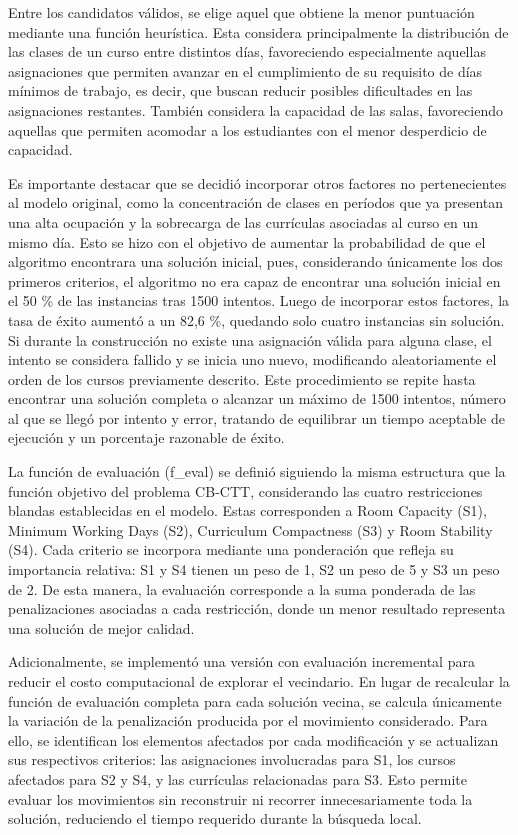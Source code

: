 \documentclass[letter, 10pt]{article}
\begin{document}
Entre los candidatos v\'alidos, se elige aquel que obtiene la menor puntuaci\'on mediante una funci\'on heur\'istica. Esta considera principalmente la distribuci\'on de las clases de un curso entre distintos d\'ias, favoreciendo especialmente aquellas asignaciones que permiten avanzar en el cumplimiento de su requisito de d\'ias m\'inimos de trabajo, es decir, que buscan reducir posibles dificultades en las asignaciones restantes. Tambi\'en considera la capacidad de las salas, favoreciendo aquellas que permiten acomodar a los estudiantes con el menor desperdicio de capacidad.

Es importante destacar que se decidi\'o incorporar otros factores no pertenecientes al modelo original, como la concentraci\'on de clases en per\'iodos que ya presentan una alta ocupaci\'on y la sobrecarga de las curr\'iculas asociadas al curso en un mismo d\'ia. Esto se hizo con el objetivo de aumentar la probabilidad de que el algoritmo encontrara una soluci\'on inicial, pues, considerando \'unicamente los dos primeros criterios, el algoritmo no era capaz de encontrar una soluci\'on inicial en el 50 \% de las instancias tras 1500 intentos. Luego de incorporar estos factores, la tasa de \'exito aument\'o a un 82,6 \%, quedando solo cuatro instancias sin soluci\'on. Si durante la construcci\'on no existe una asignaci\'on v\'alida para alguna clase, el intento se considera fallido y se inicia uno nuevo, modificando aleatoriamente el orden de los cursos previamente descrito. Este procedimiento se repite hasta encontrar una soluci\'on completa o alcanzar un m\'aximo de 1500 intentos, n\'umero al que se lleg\'o por intento y error, tratando de equilibrar un tiempo aceptable de ejecuci\'on y un porcentaje razonable de \'exito.

La funci\'on de evaluaci\'on (f\_eval) se defini\'o siguiendo la misma estructura que la funci\'on objetivo del problema CB-CTT, considerando las cuatro restricciones blandas establecidas en el modelo. Estas corresponden a Room Capacity (S1), Minimum Working Days (S2), Curriculum Compactness (S3) y Room Stability (S4). Cada criterio se incorpora mediante una ponderaci\'on que refleja su importancia relativa: S1 y S4 tienen un peso de 1, S2 un peso de 5 y S3 un peso de 2. De esta manera, la evaluaci\'on corresponde a la suma ponderada de las penalizaciones asociadas a cada restricci\'on, donde un menor resultado representa una soluci\'on de mejor calidad.

Adicionalmente, se implement\'o una versi\'on con evaluaci\'on incremental para reducir el costo computacional de explorar el vecindario. En lugar de recalcular la funci\'on de evaluaci\'on completa para cada soluci\'on vecina, se calcula \'unicamente la variaci\'on de la penalizaci\'on producida por el movimiento considerado. Para ello, se identifican los elementos afectados por cada modificaci\'on y se actualizan sus respectivos criterios: las asignaciones involucradas para S1, los cursos afectados para S2 y S4, y las curr\'iculas relacionadas para S3. Esto permite evaluar los movimientos sin reconstruir ni recorrer innecesariamente toda la soluci\'on, reduciendo el tiempo requerido durante la b\'usqueda local.
\end{document}
